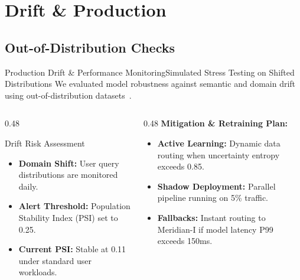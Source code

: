 \section{Drift \& Production}
\subsection{Out-of-Distribution Checks}

\begin{frame}{Production Drift \& Performance Monitoring}{Simulated Stress Testing on Shifted Distributions}
  We evaluated model robustness against semantic and domain drift using out-of-distribution datasets~\cite{vance2026drift}.
  
  \vspace{0.3cm}
  \begin{columns}[T]
    \begin{column}{0.48\textwidth}
      \begin{driftbox}{Drift Risk Assessment}
        \begin{itemize}
          \item \textbf{Domain Shift:} User query distributions are monitored daily.
          \item \textbf{Alert Threshold:} Population Stability Index (PSI) set to 0.25.
          \item \textbf{Current PSI:} Stable at 0.11 under standard user workloads.
        \end{itemize}
      \end{driftbox}
    \end{column}
    \hfill
    \begin{column}{0.48\textwidth}
      \textbf{Mitigation \& Retraining Plan:}
      \begin{itemize}
        \item \textbf{Active Learning:} Dynamic data routing when uncertainty entropy exceeds 0.85.
        \item \textbf{Shadow Deployment:} Parallel pipeline running on 5\% traffic.
        \item \textbf{Fallbacks:} Instant routing to Meridian-I if model latency P99 exceeds 150ms.
      \end{itemize}
    \end{column}
  \end{columns}
\end{frame}
